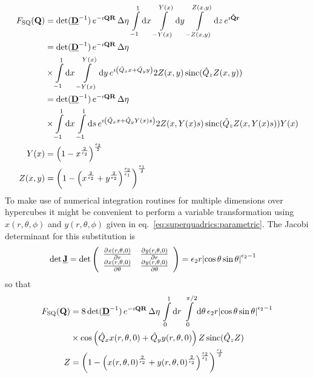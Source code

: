 \begin{align}\label{eq:FTsuperquadrics}
  F_\mathrm{SQ}(\B{Q}) &=
\det(\M{D}^{-1})\, e^{-\imath\B{QR}}\, \Delta\eta\, \int\limits_{-1}^1
\mathrm{d}x\, \int\limits_{-Y(x)}^{Y(x)} \mathrm{d}y\,  \int\limits_{-Z(x,y)}^{Z(x,y)} \mathrm{d}z \,
e^{\imath\B{\hat{Q}r}} \nonumber \\
 &=
\det(\M{D}^{-1})\, e^{-\imath\B{QR}}\, \Delta\eta\,   \\
& \times \int\limits_{-1}^1
\mathrm{d}x\, \int\limits_{-Y(x)}^{Y(x)} \mathrm{d}y\,
e^{\imath\left(\hat{Q}_xx+\hat{Q}_yy\right)} 2Z(x,y)\operatorname{sinc}(\hat{Q}_z Z(x,y))\nonumber \\
&= \det(\M{D}^{-1})\, e^{-\imath\B{QR}}\, \Delta\eta\, \\
& \times \int\limits_{-1}^1
\mathrm{d}x\, \int\limits_{-1}^{1} \mathrm{d}s\,
e^{\imath\left(\hat{Q}_xx+\hat{Q}_yY(x)s\right)} 2Z(x,Y(x)s)\operatorname{sinc}(\hat{Q}_z Z(x,Y(x)s))Y(x)\nonumber \\
Y(x) &= \left(1-x^{\frac{2}{\epsilon_2}}\right)^{\frac{\epsilon_2}{2}}\\
Z(x,y) &= \left(1-\left(x^{\frac{2}{\epsilon_2}}+y^{\frac{2}{\epsilon_2}}\right)^{\frac{\epsilon_2}{\epsilon_1}}\right)^{\frac{\epsilon_1}{2}}
\end{align}
To make use of numerical integration routines for multiple dimensions over hypercubes it might be convenient to perform a variable transformation using $ x(r,\theta,\phi)$ and $ y(r,\theta,\phi)$ given in eq.\ \ref{eq:superquadrics:parametric}. The Jacobi determinant for this substitution is
\begin{align}\label{eq:detJ_superquadrics}
  \det{\M{J}} &= \det
  \left(
    \begin{array}{cc}
      \frac{\partial x(r,\theta,0)}{\partial r}      & \frac{\partial y(r,\theta,0)}{\partial r}\\
      \frac{\partial x(r,\theta,0)}{\partial \theta} & \frac{\partial y(r,\theta,0)}{\partial \theta}
    \end{array}
  \right) = \epsilon_2 r \abs{\cos\theta\sin\theta}^{\epsilon_2-1}
\end{align}
so that
\begin{align}
\begin{split}
F_\mathrm{SQ}(\B{Q}) &= 8 \det(\M{D}^{-1})\, e^{-\imath\B{QR}}\, \Delta\eta\,\int\limits_{0}^1
\mathrm{d}r\, \int\limits_{0}^{\pi/2} \mathrm{d}\theta\,  \epsilon_2 r \abs{\cos\theta\sin\theta}^{\epsilon_2-1}\\
     &\times \cos\left(\hat{Q}_xx(r,\theta,0)+\hat{Q}_yy(r,\theta,0)\right) Z\operatorname{sinc}(\hat{Q}_z Z)\nonumber \\
Z &= \left(1-\left(x(r,\theta,0)^{\frac{2}{\epsilon_2}}+y(r,\theta,0)^{\frac{2}{\epsilon_2}}\right)^{\frac{\epsilon_2}{\epsilon_1}}\right)^{\frac{\epsilon_1}{2}}
\end{split}
\end{align}

